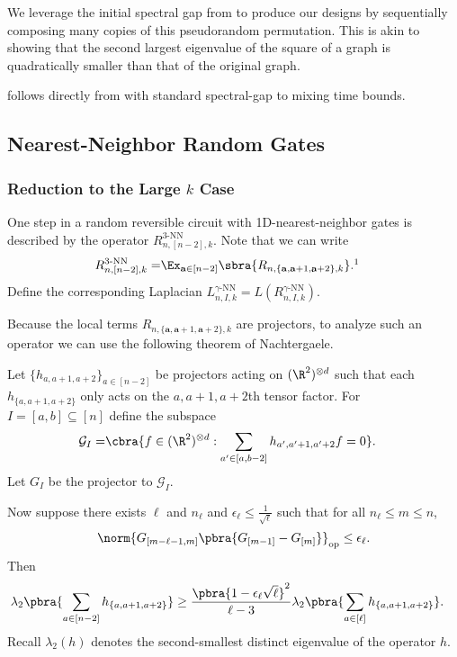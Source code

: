 We leverage the initial spectral gap from  to produce our designs by sequentially composing many copies of this pseudorandom permutation. This is akin to showing that the second largest eigenvalue of the square of a graph is quadratically smaller than that of the original graph.

 follows directly from  with standard spectral-gap to mixing time bounds.


\subsection{Nearest-Neighbor Random Gates}
\subsubsection{Reduction to the Large $k$ Case}

One step in a random reversible circuit with 1D-nearest-neighbor gates is described by the operator $R_{n,[n-2],k}^{3\text{-NN}}$. Note that we can write 
\begin{align*}
    R_{n,[n-2],k}^{3\text{-NN}}=& \Ex_{\mathbf{a}\in[n-2]}\sbra{R_{n,\{\mathbf{a},\mathbf{a}+1,\mathbf{a}+2\},k}}.\footnotemark
\end{align*}
Define the corresponding Laplacian $L_{n,I,k}^{\gamma\text{-NN}}=L(R_{n,I,k}^{\gamma\text{-NN}})$. 

Because the local terms $R_{n,\{\mathbf{a},\mathbf{a}+1,\mathbf{a}+2\},k}$ are projectors, to analyze such an operator we can use the following theorem of Nachtergaele.
\begin{theorem}\label{thm:nachtergaele}
    Let $\{h_{a,a+1,a+2}\}_{a\in[n-2]}$ be projectors acting on $(\R^2)^{\otimes d}$ such that each $h_{\{a,a+1,a+2\}}$ only acts on the $a,a+1,a+2$th tensor factor. For $I=[a,b]\subseteq[n]$ define the subspace
    \begin{align*}
        \mathcal{G}_I=& \cbra{f\in (\R^2)^{\otimes d}:\sum_{a'\in [a,b-2]}h_{a',a'+1,a'+2}f = 0}.
    \end{align*}
    Let $G_I$ be the projector to $\mathcal{G}_I$.

    Now suppose there exists $\ell$ and $n_\ell$ and $\epsilon_\ell\leq \frac1{\sqrt\ell}$ such that for all $n_\ell\leq m\leq n$,
    \begin{align*}
        \norm{G_{[m-\ell-1,m]}\pbra{G_{[m-1]}-G_{[m]}}}_{\mathrm{op}}\leq \epsilon_\ell.
    \end{align*}
    Then
    \begin{align*}
        \lambda_{2}\pbra{\sum_{a\in[n-2]}h_{\{{a},{a}+1,{a}+2\}}}&\geq \frac{\pbra{1-\epsilon_\ell\sqrt\ell}^2}{\ell-3}\lambda_{2}\pbra{
        \sum_{a\in[\ell]}h_{\{{a},{a}+1,{a}+2\}}}.
    \end{align*}
    Recall $\lambda_2(h)$ denotes the second-smallest distinct eigenvalue of the operator $h$.
\end{theorem}

